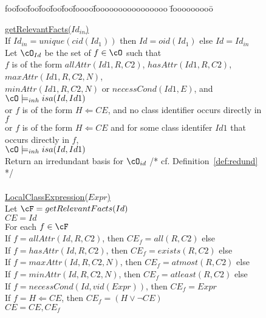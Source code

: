 \begin{figure}[htbp]
\longline
{\sf
\begin{tabbing}
foo\=foo\=foo\=foo\=foo\=foo\=foooo\=foooooooooooooooo \=fooooooooo\=\kill

\> \underline{getRelevantFacts($Id_{in}$)} \\
\> \> If $Id_{in} = unique(cid(Id_1))$ then $Id = oid(Id_1)$ else $Id = Id_{in}$ \\
\> \> Let $\cO_{Id}$ be the set of $f \in \cO$ such that  \\
\> \> \> $f$ is of the form $allAttr(Id1,R,C2)$, 
$hasAttr(Id1,R,C2)$, $maxAttr(Id1,R,C2,N)$,  \\
\> \> \> \> \> $minAttr(Id1,R,C2,N)$ or $necessCond(Id1,E)$, and  $\cO
			\models_{inh} isa(Id,Id1)$ \\ 
\> \> \> or $f$ is of the form $H \Leftarrow CE$, and  no class
	identifier occurs directly in $f$ \\
\> \> \> or $f$ is of the form $H \Leftarrow CE$ and for some class identifer
	$Id1$ that occurs directly in $f$,  \\
\> \> \> \> \>  $\cO \models_{inh} isa(Id,Id1)$ \\
\> \> Return an irredundant basis for $\cO_{id}$ 
\> \> \> \> \> \> \>		{\rm /* cf. Definition~\ref{def:redund} */}\\
\ \\
\>  \underline{LocalClassExpression($Expr $)}  \\
\> \> Let $\cF = getRelevantFacts(Id)$ \\
\> \> $CE = Id$ \\
\> \> For each $f \in \cF$ \\
\> \> \> If $f = allAttr(Id,R,C2)$, then $CE_f = all(R,C2)$ else \\
\> \> \> If $f = hasAttr(Id,R,C2)$, then $CE_f = exists(R,C2)$ else \\
\> \> \> If $f = maxAttr(Id,R,C2,N)$, then $CE_f = atmost(R,C2)$ else \\
\> \> \> If $f = minAttr(Id,R,C2,N)$, then $CE_f = atleast(R,C2)$ else
									\\
\> \> \> If $f = necessCond(Id,vid(Expr))$, then $CE_f = Expr$ \\
\> \> \> If $f = H \Leftarrow CE$, then $CE_f = (H \vee \neg CE)$ \\
\> \> \> $CE = CE,CE_f$ \\

\end{tabbing}}
\end{figure}
